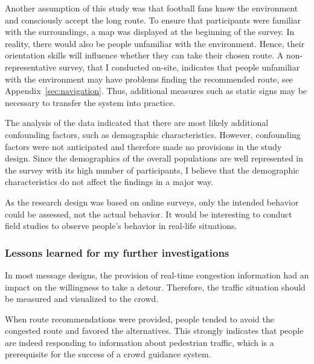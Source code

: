 Another assumption of this study was that football fans know the environment and consciously accept the long route. To ensure that participants were familiar with the surroundings, a map was displayed at the beginning of the survey. In reality, there would also be people unfamiliar with the environment. Hence, their orientation skills will influence whether they can take their chosen route. A non-representative survey, that I conducted on-site, indicates that people unfamiliar with the environment may have problems finding the recommended route, see Appendix~\ref{sec:navigation}. Thus, additional measures such as static signs may be necessary to transfer the system into practice.

The analysis of the data indicated that there are most likely additional confounding factors, such as demographic characteristics. However, confounding factors were not anticipated and therefore made no provisions in the study design. Since the demographics of the overall populations are well represented in the survey with its high number of participants, I believe that the demographic characteristics do not affect the findings in a major way.

As the research design was based on online surveys, only the intended behavior could be assessed, not the actual behavior. It would be interesting to conduct field studies to observe people's behavior in real-life situations.

\subsubsection{Lessons learned for my further investigations}

In most message designs, the provision of real-time congestion information had an impact on the willingness to take a detour. Therefore, the traffic situation should be measured and visualized to the crowd. 

When route recommendations were provided, people tended to avoid the congested route and favored the alternatives. This strongly indicates that people are indeed responding to information about pedestrian traffic, which is a prerequisite for the success of a crowd guidance system.



\newpage

